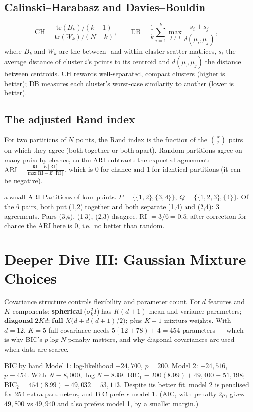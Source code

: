 \documentclass[11pt]{article}
\begin{document}
\subsection{Calinski--Harabasz and Davies--Bouldin}
\[\text{CH}=\frac{\text{tr}(B_k)/(k-1)}{\text{tr}(W_k)/(N-k)},\qquad\text{DB}=\frac1k\sum_{i=1}^k\max_{j\ne i}\frac{s_i+s_j}{d(\mu_i,\mu_j)},\]
where $B_k$ and $W_k$ are the between- and within-cluster scatter matrices, $s_i$ the average distance of cluster $i$'s points to its centroid and $d(\mu_i,\mu_j)$ the distance between centroids. CH rewards well-separated, compact clusters (higher is better); DB measures each cluster's worst-case similarity to another (lower is better).

\subsection{The adjusted Rand index}
For two partitions of $N$ points, the Rand index is the fraction of the $\binom N2$ pairs on which they agree (both together or both apart). Random partitions agree on many pairs by chance, so the ARI subtracts the expected agreement: $\text{ARI}=\frac{\text{RI}-E[\text{RI}]}{\max\text{RI}-E[\text{RI}]}$, which is 0 for chance and 1 for identical partitions (it can be negative).
\begin{example}{a small ARI}
Partitions of four points: $P=\{\{1,2\},\{3,4\}\}$, $Q=\{\{1,2,3\},\{4\}\}$. Of the 6 pairs, both put (1,2) together and both separate (1,4) and (2,4): 3 agreements. Pairs (3,4), (1,3), (2,3) disagree. RI $=3/6=0.5$; after correction for chance the ARI here is 0, i.e.\ no better than random.
\end{example}

\section{Deeper Dive III: Gaussian Mixture Choices}
Covariance structure controls flexibility and parameter count. For $d$ features and $K$ components: \textbf{spherical} ($\sigma_k^2I$) has $K(d+1)$ mean-and-variance parameters; \textbf{diagonal} $2Kd$; \textbf{full} $K\big(d+d(d+1)/2\big)$; plus $K-1$ mixture weights. With $d=12$, $K=5$ full covariance needs $5(12+78)+4=454$ parameters --- which is why BIC's $p\log N$ penalty matters, and why diagonal covariances are used when data are scarce.
\begin{example}{BIC by hand}
Model 1: log-likelihood $-24{,}700$, $p=200$. Model 2: $-24{,}516$, $p=454$. With $N=8{,}000$, $\log N=8.99$. BIC$_1=200(8.99)+49{,}400=51{,}198$; BIC$_2=454(8.99)+49{,}032=53{,}113$. Despite its better fit, model 2 is penalised for 254 extra parameters, and BIC prefers model 1. (AIC, with penalty $2p$, gives $49{,}800$ vs $49{,}940$ and also prefers model 1, by a smaller margin.)
\end{example}
\end{document}
